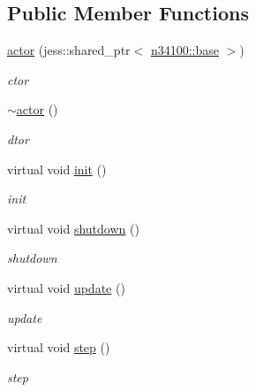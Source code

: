 \subsection*{Public Member Functions}
\begin{DoxyCompactItemize}
\item 
\hyperlink{classnebula_1_1content_1_1actor_1_1physics_1_1actor_a0c3272c3403989fcdb0473626828e1bc}{actor} (jess::shared\_\-ptr$<$ \hyperlink{classnebula_1_1content_1_1actor_1_1admin_1_1base}{n34100::base} $>$)
\begin{DoxyCompactList}\small\item\em ctor \item\end{DoxyCompactList}\item 
\hyperlink{classnebula_1_1content_1_1actor_1_1physics_1_1actor_ab55f739894c43f00ba9b60b0a54c12be}{$\sim$actor} ()
\begin{DoxyCompactList}\small\item\em dtor \item\end{DoxyCompactList}\item 
virtual void \hyperlink{classnebula_1_1content_1_1actor_1_1physics_1_1actor_a7ab3552a370009bff858cbff7245bc9c}{init} ()
\begin{DoxyCompactList}\small\item\em init \item\end{DoxyCompactList}\item 
virtual void \hyperlink{classnebula_1_1content_1_1actor_1_1physics_1_1actor_ae995fe68be64a916df1bb7174cb8c7a3}{shutdown} ()
\begin{DoxyCompactList}\small\item\em shutdown \item\end{DoxyCompactList}\item 
virtual void \hyperlink{classnebula_1_1content_1_1actor_1_1physics_1_1actor_a7b7a1ee3673ad9f618a20e327e1a974c}{update} ()
\begin{DoxyCompactList}\small\item\em update \item\end{DoxyCompactList}\item 
virtual void \hyperlink{classnebula_1_1content_1_1actor_1_1physics_1_1actor_a0f97a976e76248d8072fcb9508353f16}{step} ()
\begin{DoxyCompactList}\small\item\em step \item\end{DoxyCompactList}\end{DoxyCompactItemize}
